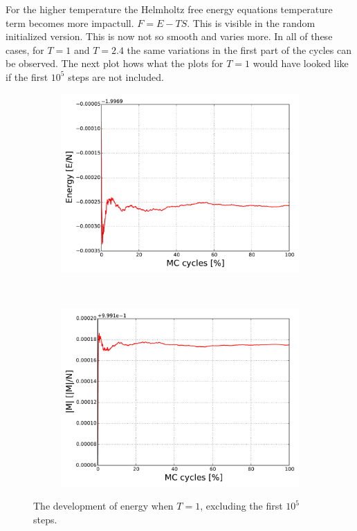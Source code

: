 For the higher temperature the Helmholtz free energy equations temperature term becomes more impactull. $F=E-TS$. This is visible in the random initialized version. This is now not so smooth and varies more. In all of these cases, for $T=1$ and $T=2.4$ the same variations in the first part of the cycles can be observed. The next plot hows what the plots for $T=1$ would have looked like if the first $10^5$ steps are not included.


\begin{figure}[H]
    \centering
    \begin{subfigure}{0.5\textwidth}
        \centering
        \includegraphics[width=\linewidth]{result/bilder/20x20/E-N20-T1-Term}
        \caption{}
    \end{subfigure}%
    ~ 
    \begin{subfigure}{0.5\textwidth}
        \centering
        \includegraphics[width=\linewidth]{result/bilder/20x20/M-N20-T1-Term}
        \caption{}
    \end{subfigure}
    \caption{The development of energy when $T = 1$, excluding the first $10^5$ steps.  }
    \label{fig:equilibrium}
\end{figure}


